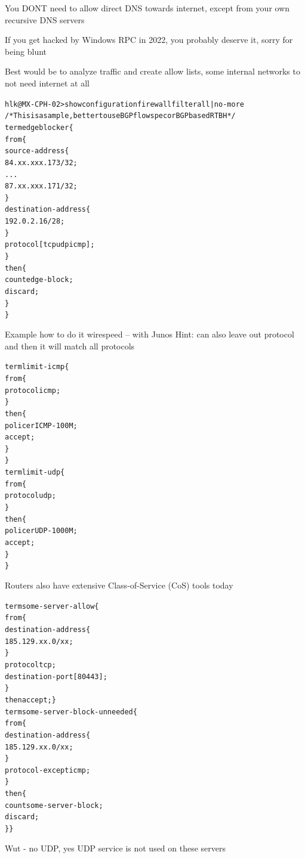 \documentclass[Screen16to9,17pt]{foils}
\begin{document}
You DONT need to allow direct DNS towards internet, except from your own recursive DNS servers

If you get hacked by Windows RPC in 2022, you probably deserve it, sorry for being blunt

Best would be to analyze traffic and create allow lists, some internal networks to not need internet at all




\begin{alltt}\scriptsize
hlk@MX-CPH-02> show configuration firewall filter all | no-more
/* This is a sample, better to use BGP flowspec or BGP based RTBH */
term edgeblocker \{
    from \{
        source-address \{
            84.xx.xxx.173/32;
...
            87.xx.xxx.171/32;
        \}
        destination-address \{
            192.0.2.16/28;
        \}
        protocol [ tcp udp icmp ];
    \}
    then \{
        count edge-block;
        discard;
    \}
\}
\end{alltt}
Example how to do it wirespeed -- with Junos
Hint: can also leave out protocol and then it will match all protocols


\begin{alltt}\scriptsize
term limit-icmp \{
    from \{
        protocol icmp;
    \}
    then \{
        policer ICMP-100M;
        accept;
    \}
\}
term limit-udp \{
    from \{
        protocol udp;
    \}
    then \{
        policer UDP-1000M;
        accept;
    \}
\}
\end{alltt}

Routers also have extensive Class-of-Service (CoS) tools today


\begin{alltt}\scriptsize
term some-server-allow \{
    from \{
        destination-address \{
            185.129.xx.0/xx;
        \}
        protocol tcp;
        destination-port [ 80 443 ];
    \}
    then accept;\}
term some-server-block-unneeded \{
    from \{
        destination-address \{
            185.129.xx.0/xx;
        \}
        protocol-except icmp;
    \}
    then \{
        count some-server-block;
        discard;
    \}\}
\end{alltt}

Wut - no UDP, yes UDP service is not used on these servers
\end{document}

